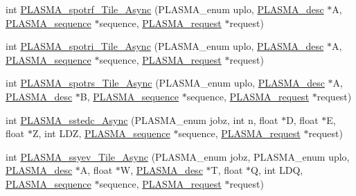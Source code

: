 \begin{DoxyCompactItemize}
int \hyperlink{group__float__Tile__Async_ga9a217d8289a1d9bc19a5b6902e774343_ga9a217d8289a1d9bc19a5b6902e774343}{P\+L\+A\+S\+M\+A\+\_\+spotrf\+\_\+\+Tile\+\_\+\+Async} (P\+L\+A\+S\+M\+A\+\_\+enum uplo, \hyperlink{structplasma__desc__t}{P\+L\+A\+S\+M\+A\+\_\+desc} $\ast$A, \hyperlink{structplasma__sequence__t}{P\+L\+A\+S\+M\+A\+\_\+sequence} $\ast$sequence, \hyperlink{structplasma__request__t}{P\+L\+A\+S\+M\+A\+\_\+request} $\ast$request)
\item 
int \hyperlink{group__float__Tile__Async_ga8069a24dfebe70194fa0bd6e9bb8ed62_ga8069a24dfebe70194fa0bd6e9bb8ed62}{P\+L\+A\+S\+M\+A\+\_\+spotri\+\_\+\+Tile\+\_\+\+Async} (P\+L\+A\+S\+M\+A\+\_\+enum uplo, \hyperlink{structplasma__desc__t}{P\+L\+A\+S\+M\+A\+\_\+desc} $\ast$A, \hyperlink{structplasma__sequence__t}{P\+L\+A\+S\+M\+A\+\_\+sequence} $\ast$sequence, \hyperlink{structplasma__request__t}{P\+L\+A\+S\+M\+A\+\_\+request} $\ast$request)
\item 
int \hyperlink{group__float__Tile__Async_ga5a9d82d08cb6da30647e71a4e3e3fc70_ga5a9d82d08cb6da30647e71a4e3e3fc70}{P\+L\+A\+S\+M\+A\+\_\+spotrs\+\_\+\+Tile\+\_\+\+Async} (P\+L\+A\+S\+M\+A\+\_\+enum uplo, \hyperlink{structplasma__desc__t}{P\+L\+A\+S\+M\+A\+\_\+desc} $\ast$A, \hyperlink{structplasma__desc__t}{P\+L\+A\+S\+M\+A\+\_\+desc} $\ast$B, \hyperlink{structplasma__sequence__t}{P\+L\+A\+S\+M\+A\+\_\+sequence} $\ast$sequence, \hyperlink{structplasma__request__t}{P\+L\+A\+S\+M\+A\+\_\+request} $\ast$request)
\item 
int \hyperlink{group__float__Tile__Async_gae07daad5ba7243201fa5a857330d66d2_gae07daad5ba7243201fa5a857330d66d2}{P\+L\+A\+S\+M\+A\+\_\+sstedc\+\_\+\+Async} (P\+L\+A\+S\+M\+A\+\_\+enum jobz, int n, float $\ast$D, float $\ast$E, float $\ast$Z, int L\+D\+Z, \hyperlink{structplasma__sequence__t}{P\+L\+A\+S\+M\+A\+\_\+sequence} $\ast$sequence, \hyperlink{structplasma__request__t}{P\+L\+A\+S\+M\+A\+\_\+request} $\ast$request)
\item 
int \hyperlink{group__float__Tile__Async_gac9cbb6cbbdf3fa90ce59fc6909c8a846_gac9cbb6cbbdf3fa90ce59fc6909c8a846}{P\+L\+A\+S\+M\+A\+\_\+ssyev\+\_\+\+Tile\+\_\+\+Async} (P\+L\+A\+S\+M\+A\+\_\+enum jobz, P\+L\+A\+S\+M\+A\+\_\+enum uplo, \hyperlink{structplasma__desc__t}{P\+L\+A\+S\+M\+A\+\_\+desc} $\ast$A, float $\ast$W, \hyperlink{structplasma__desc__t}{P\+L\+A\+S\+M\+A\+\_\+desc} $\ast$T, float $\ast$Q, int L\+D\+Q, \hyperlink{structplasma__sequence__t}{P\+L\+A\+S\+M\+A\+\_\+sequence} $\ast$sequence, \hyperlink{structplasma__request__t}{P\+L\+A\+S\+M\+A\+\_\+request} $\ast$request)
\item 

\end{DoxyCompactItemize}
